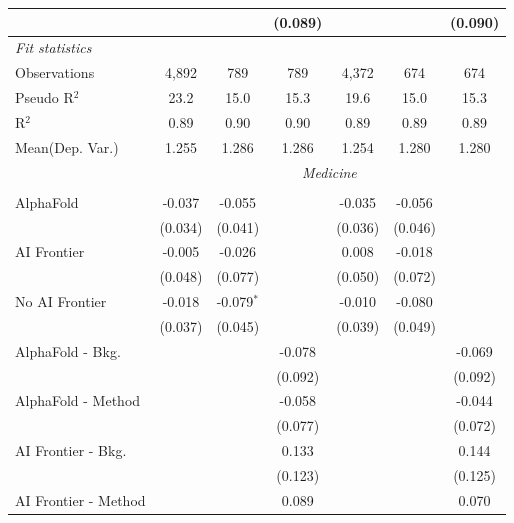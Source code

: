 \begin{tabular}{lcccccc}
                           &         &              & (0.089)        &         &               & (0.090)\\   
   \midrule
   \emph{Fit statistics}\\
   Observations            & 4,892   & 789          & 789            & 4,372   & 674           & 674\\  
   Pseudo R$^2$            & 23.2    & 15.0         & 15.3           & 19.6    & 15.0          & 15.3\\  
   R$^2$                   & 0.89    & 0.90         & 0.90           & 0.89    & 0.89          & 0.89\\  
   
Mean(Dep. Var.) & 1.255 & 1.286 & 1.286 & 1.254 & 1.280 & 1.280 \\
 & \multicolumn{6}{c}{\textit{Medicine}} \\ \\
   AlphaFold               & -0.037  & -0.055       &         & -0.035  & -0.056  &   \\   
                           & (0.034) & (0.041)      &         & (0.036) & (0.046) &   \\   
   AI Frontier             & -0.005  & -0.026       &         & 0.008   & -0.018  &   \\   
                           & (0.048) & (0.077)      &         & (0.050) & (0.072) &   \\   
   No AI Frontier          & -0.018  & -0.079$^{*}$ &         & -0.010  & -0.080  &   \\   
                           & (0.037) & (0.045)      &         & (0.039) & (0.049) &   \\   
   AlphaFold - Bkg.        &         &              & -0.078  &         &         & -0.069\\   
                           &         &              & (0.092) &         &         & (0.092)\\   
   AlphaFold - Method      &         &              & -0.058  &         &         & -0.044\\   
                           &         &              & (0.077) &         &         & (0.072)\\   
   AI Frontier - Bkg.      &         &              & 0.133   &         &         & 0.144\\   
                           &         &              & (0.123) &         &         & (0.125)\\   
   AI Frontier - Method    &         &              & 0.089   &         &         & 0.070\\   

\end{tabular}
